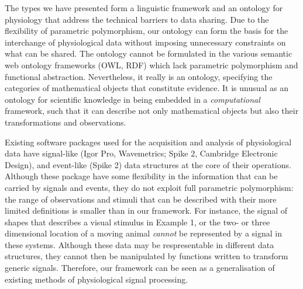 The types we have presented form a linguistic framework and an
ontology for physiology that address the technical barriers to data
sharing. Due to the flexibility of parametric polymorphism, our
ontology can form the basis for the interchange of physiological data
without imposing unnecessary constraints on what can be shared. The
ontology cannot be formulated in the various semantic web ontology
frameworks (OWL, RDF) which lack parametric polymorphism and
functional abstraction. Nevertheless, it really is an ontology,
specifying the categories of mathematical objects that constitute
evidence. It is unusual as an ontology for scientific knowledge in
being embedded in a \emph{computational} framework, such that it can
describe not only mathematical objects but also their transformations
and observations.

Existing software packages used for the acquisition and analysis of
physiological data have signal-like (Igor Pro, Wavemetrics; Spike 2,
Cambridge Electronic Design), and event-like (Spike 2) data structures
at the core of their operations. Although these package have some
flexibility in the information that can be carried by signals and
events, they do not exploit full parametric polymorphism: the range of
observations and stimuli that can be described with their more limited
definitions is smaller than in our framework. For instance, the signal
of shapes that describes a visual stimulus in Example 1, or the two-
or three dimensional location of a moving animal \emph{cannot} be
represented by a signal in these systems. Although these data may be
respresentable in different data structures, they cannot then be
manipulated by functions written to transform generic
signals. Therefore, our framework can be seen as a generalisation of
existing methods of physiological signal processing.

